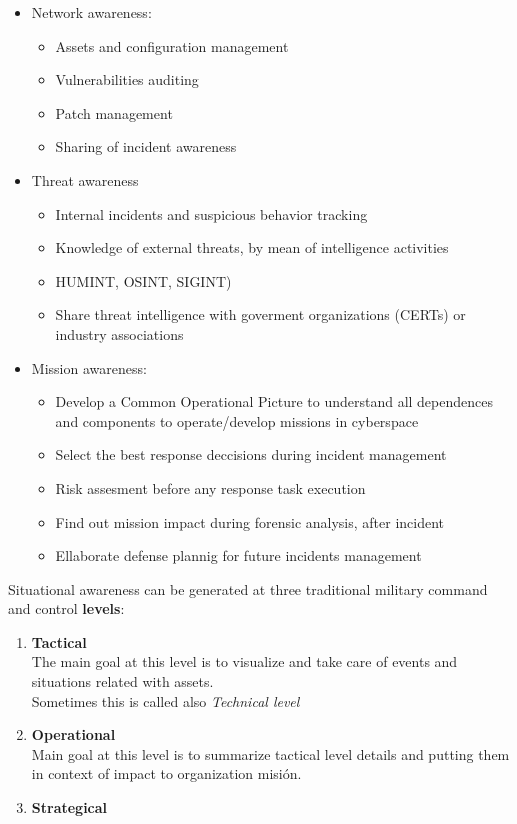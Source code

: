 \begin{itemize}
	\item Network awareness:
   \begin{itemize}
	\item Assets and configuration management
	\item Vulnerabilities auditing
	\item Patch management
	\item Sharing of incident awareness
   \end{itemize}
	\item Threat awareness
   \begin{itemize}
	\item Internal incidents and suspicious behavior tracking
	\item Knowledge of external threats, by mean of intelligence activities
	\item HUMINT, OSINT, SIGINT)
	\item Share threat intelligence with goverment organizations (CERTs) or
industry associations
   \end{itemize}
	\item Mission awareness:
   \begin{itemize}
	\item Develop a Common Operational Picture to understand all
dependences and components to operate/develop missions in
cyberspace
	\item Select the best response deccisions during incident management
	\item Risk assesment before any response task execution
	\item Find out mission impact during forensic analysis, after incident
	\item Ellaborate defense plannig for future incidents management
   \end{itemize}
\end{itemize}

Situational awareness can be generated at three traditional military command and control \textbf{levels}:
\begin{enumerate}
	\item \textbf{Tactical}\\
	The main goal at this level is to visualize and take care of events and situations related with assets.\\
   Sometimes this is called also \textit{Technical level}

	\item \textbf{Operational}\\
	Main goal at this level is to summarize tactical level details and putting them in context of impact to organization misión.
	\item \textbf{Strategical}
\end{enumerate}

